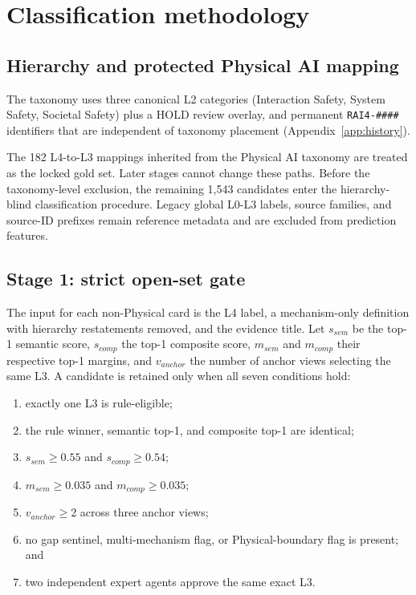 \documentclass[11pt,a4paper]{article}
\newcommand{\code}[1]{\texttt{#1}}
\begin{document}
\section{Classification methodology}
\label{sec:methods}

\subsection{Hierarchy and protected Physical AI mapping}

The taxonomy uses three canonical L2 categories (Interaction Safety, System
Safety, Societal Safety) plus a HOLD review overlay, and permanent
\code{RAI4-\#\#\#\#} identifiers that are independent of taxonomy placement
(Appendix~\ref{app:history}).

The 182 L4-to-L3 mappings inherited from the Physical AI taxonomy are treated
as the locked gold set. Later stages cannot change these paths. Before the
taxonomy-level exclusion, the remaining 1,543 candidates enter the
hierarchy-blind classification procedure. Legacy global
L0-L3 labels, source families, and source-ID prefixes remain reference metadata
and are excluded from prediction features.

\subsection{Stage 1: strict open-set gate}

The input for each non-Physical card is the L4 label, a mechanism-only
definition with hierarchy restatements removed, and the evidence title. Let
$s_{sem}$ be the top-1 semantic score, $s_{comp}$ the top-1 composite score,
$m_{sem}$ and $m_{comp}$ their respective top-1 margins, and $v_{anchor}$ the
number of anchor views selecting the same L3. A candidate is retained only when
all seven conditions hold:

\begin{enumerate}[leftmargin=2em]
  \item exactly one L3 is rule-eligible;
  \item the rule winner, semantic top-1, and composite top-1 are identical;
  \item $s_{sem}\geq0.55$ and $s_{comp}\geq0.54$;
  \item $m_{sem}\geq0.035$ and $m_{comp}\geq0.035$;
  \item $v_{anchor}\geq2$ across three anchor views;
  \item no gap sentinel, multi-mechanism flag, or Physical-boundary flag is present; and
  \item two independent expert agents approve the same exact L3.
\end{enumerate}
\end{document}
